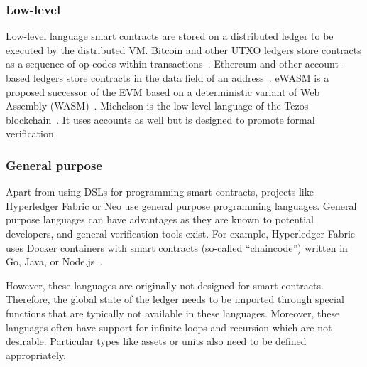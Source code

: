 \subsubsection{Low-level}
Low-level language smart contracts are stored on a distributed ledger to be executed by the distributed VM.
Bitcoin and other UTXO ledgers store contracts as a sequence of op-codes within transactions~\cite{BitcoinWiki2018Script}. 
Ethereum and other account-based ledgers store contracts in the data field of an address~\cite{Wood2014}. 
eWASM is a proposed successor of the EVM based on a deterministic variant of Web Assembly (WASM)~\cite{Wanderer2015,EthereumFoundation2018ewasm}.
Michelson is the low-level language of the Tezos blockchain~\cite{DynamicLedgerSolutions2017}. It uses accounts as well but is designed to promote formal verification.

\subsubsection{General purpose}
Apart from using DSLs for programming smart contracts, projects like Hyperledger Fabric or Neo use general purpose programming languages.
General purpose languages can have advantages as they are known to potential developers, and general verification tools exist.
For example, Hyperledger Fabric uses Docker containers with smart contracts (so-called ``chaincode'') written in Go, Java, or Node.js~\cite{Cachin2016}. 

However, these languages are originally not designed for smart contracts. Therefore, the global state of the ledger needs to be imported through special functions that are typically not available in these languages.
Moreover, these languages often have support for infinite loops and recursion which are not desirable.
Particular types like assets or units also need to be defined appropriately. 

